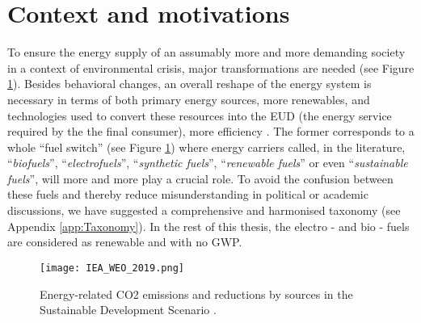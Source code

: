\section*{Context and motivations}

To ensure the energy supply of an assumably more and more demanding society in a context of environmental crisis, major transformations are needed (see Figure \ref{fig:intro:IEA_WEO_2019}). Besides behavioral changes, an overall reshape of the energy system is necessary in terms of both primary energy sources, \ie more renewables, and technologies used to convert these resources into the \gls{EUD} (\ie the energy service required by the the final consumer), \ie more efficiency \cite{iea2020world,luderer2018residual}. The former corresponds to a whole ``fuel switch'' (see Figure \ref{fig:intro:IEA_WEO_2019}) where energy carriers called, in the literature, ``\emph{biofuels}'', ``\emph{electrofuels}'', ``\emph{synthetic fuels}'', ``\emph{renewable fuels}'' or even ``\emph{sustainable fuels}'', will more and more play a crucial role. To avoid the confusion between these fuels and thereby reduce misunderstanding in political or academic discussions, we have suggested a comprehensive and harmonised taxonomy (see Appendix \ref{app:Taxonomy}). In the rest of this thesis, the electro - and bio - fuels are considered as renewable and with no \gls{GWP}.  

\begin{figure}[ht!]
\centering
\texttt{[image: IEA\_WEO\_2019.png]}
\caption{Energy-related CO2 emissions and reductions by sources in the Sustainable Development Scenario \cite{iea2020world}.}
\label{fig:intro:IEA_WEO_2019}
\end{figure}


